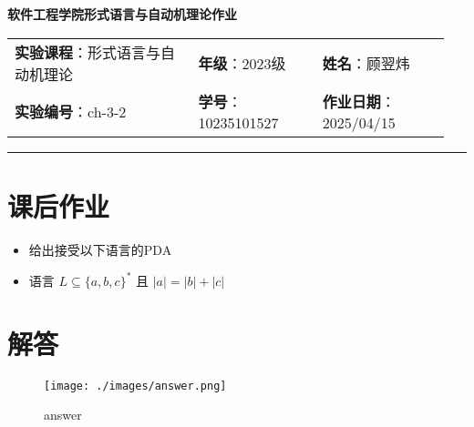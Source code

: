 \documentclass{article}
\begin{document}
	
	\begin{center}
		{\Large{\textbf{\heiti 软件工程学院形式语言与自动机理论作业}}}
		\begin{table}[htb]
			\flushleft
			\begin{tabular}{p{0.4\linewidth}p{0.27\linewidth}p{0.28\linewidth}}\\
				\textbf{实验课程}：形式语言与自动机理论  & \textbf{年级}：2023级       & \textbf{姓名}：顾翌炜  \\
				\textbf{实验编号}：ch-3-2    & \textbf{学号}：10235101527 & \textbf{作业日期}：2025/04/15  \\
			\end{tabular}
		\end{table}
	\end{center}
	\rule{\textwidth}{2pt}
	
	\section*{课后作业}
	
	\begin{itemize}
		\item 给出接受以下语言的PDA
		\item 语言 $L \subseteq \{a, b, c\}^*$ 且 $|a| = |b| + |c|$
	\end{itemize}
	
	\section*{解答}
	
	 \begin{figure}[H]
	 	\centering
	 	\texttt{[image: ./images/answer.png]}
	 	\caption{answer}
	 \end{figure}
	
\end{document}
